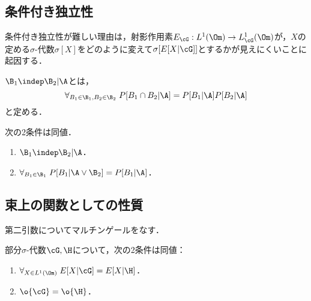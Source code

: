 \documentclass[uplatex,dvipdfmx]{jsreport}
\begin{document}
\subsection{条件付き独立性}

\begin{tcolorbox}[colframe=ForestGreen, colback=ForestGreen!10!white,breakable,colbacktitle=ForestGreen!40!white,coltitle=black,fonttitle=\bfseries\sffamily,
title=]
    条件付き独立性が難しい理由は，射影作用素$E_\cG:L^1(\Om)\to L^1_\cG(\Om)$が，$X$の定める$\sigma$-代数$\sigma[X]$をどのように変えて$\sigma[E[X|\cG]]$とするかが見えにくいことに起因する．
\end{tcolorbox}

\begin{definition}
    $\B_1\indep\B_2|\A$とは，
    \[\forall_{B_1\in\B_1,B_2\in\B_2}\;P[B_1\cap B_2|\A]=P[B_1|\A]P[B_2|\A]\]
    と定める．
\end{definition}

\begin{theorem}
    次の2条件は同値．
    \begin{enumerate}
        \item $\B_1\indep\B_2|\A$．
        \item $\forall_{B_1\in\B_1}\;P[B_1|\A\lor\B_2]=P[B_1|\A]$．
    \end{enumerate}
\end{theorem}

\subsection{束上の関数としての性質}

\begin{tcolorbox}[colframe=ForestGreen, colback=ForestGreen!10!white,breakable,colbacktitle=ForestGreen!40!white,coltitle=black,fonttitle=\bfseries\sffamily,
title=]
    第二引数についてマルチンゲールをなす．
\end{tcolorbox}

\begin{lemma}
    部分$\sigma$-代数$\cG,\H$について，次の2条件は同値：
    \begin{enumerate}
        \item $\forall_{X\in L^1(\Om)}\;E[X|\cG]=E[X|\H]$．
        \item $\o{\cG}=\o{\H}$．
    \end{enumerate}
\end{lemma}
\end{document}
